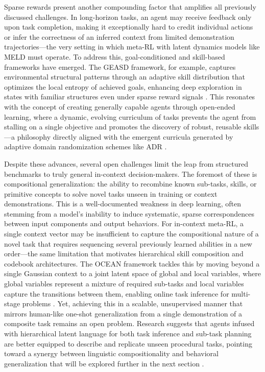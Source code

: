 \documentclass[11pt]{article}
\begin{document}
Sparse rewards present another compounding factor that amplifies all previously discussed challenges. In long-horizon tasks, an agent may receive feedback only upon task completion, making it exceptionally hard to credit individual actions or infer the correctness of an inferred context from limited demonstration trajectories---the very setting in which meta-RL with latent dynamics models like MELD must operate. To address this, goal-conditioned and skill-based frameworks have emerged. The GEASD framework, for example, captures environmental structural patterns through an adaptive skill distribution that optimizes the local entropy of achieved goals, enhancing deep exploration in states with familiar structures even under sparse reward signals \cite{ref413}. This resonates with the concept of creating generally capable agents through open-ended learning, where a dynamic, evolving curriculum of tasks prevents the agent from stalling on a single objective and promotes the discovery of robust, reusable skills---a philosophy directly aligned with the emergent curricula generated by adaptive domain randomization schemes like ADR \cite{ref414}.

Despite these advances, several open challenges limit the leap from structured benchmarks to truly general in-context decision-makers. The foremost of these is compositional generalization: the ability to recombine known sub-tasks, skills, or primitive concepts to solve novel tasks unseen in training or context demonstrations. This is a well-documented weakness in deep learning, often stemming from a model's inability to induce systematic, sparse correspondences between input components and output behaviors. For in-context meta-RL, a single context vector may be insufficient to capture the compositional nature of a novel task that requires sequencing several previously learned abilities in a new order---the same limitation that motivates hierarchical skill composition and codebook architectures. The OCEAN framework tackles this by moving beyond a single Gaussian context to a joint latent space of global and local variables, where global variables represent a mixture of required sub-tasks and local variables capture the transitions between them, enabling online task inference for multi-stage problems \cite{ref388}. Yet, achieving this in a scalable, unsupervised manner that mirrors human-like one-shot generalization from a single demonstration of a composite task remains an open problem. Research suggests that agents infused with hierarchical latent language for both task inference and sub-task planning are better equipped to describe and replicate unseen procedural tasks, pointing toward a synergy between linguistic compositionality and behavioral generalization that will be explored further in the next section \cite{ref415}.
\end{document}
